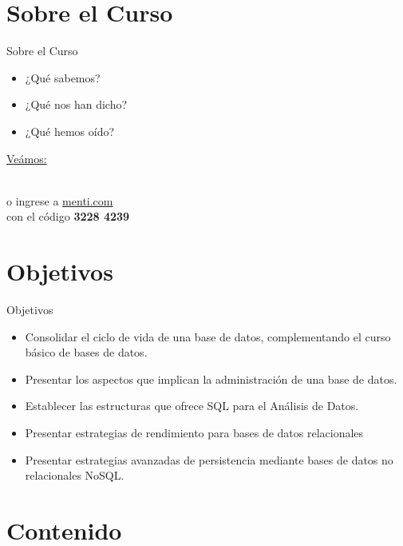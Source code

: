 \documentclass{beamer}
\begin{document}
\section{Sobre el Curso}

\begin{frame}{Sobre el Curso}
\begin{itemize}
    \item ¿Qué sabemos?
    \item ¿Qué nos han dicho?
    \item ¿Qué hemos oído?
\end{itemize}

    \centering
    \vspace{10mm}
    {\small \href{https://www.mentimeter.com/app/presentation/alwg84st66fh5c49yxg9r7k3i5jqhuwn/edit?question=uah1wimn5n7w}{Veámos:}}\\
    \vspace{2mm}
  
    \\
    \vspace{2mm}
    \footnotesize  o ingrese a \href{https://www.menti.com/}{menti.com}\\ con el código \textbf{3228 4239}
\end{frame}

\section{Objetivos}

\begin{frame}{Objetivos}
\begin{itemize}
    \item Consolidar el ciclo de vida de una base de datos, complementando el curso básico de bases de datos.
    \item Presentar los aspectos que implican la administración de una base de datos.
    \item Establecer las estructuras que ofrece SQL para el Análisis de Datos.
    \item Presentar estrategias de rendimiento para bases de datos relacionales
    \item Presentar estrategias avanzadas de persistencia mediante bases de datos no relacionales NoSQL.
\end{itemize}
\end{frame}

\section{Contenido}
\end{document}

